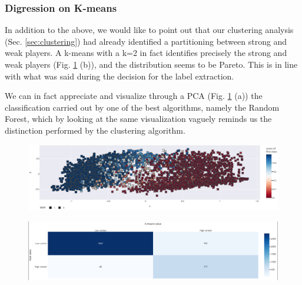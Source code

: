 \subsubsection{Digression on K-means}
In addition to the above, we would like to point out that our clustering analysis (Sec. \ref{sec:clustering}) had already identified a partitioning between strong and weak players. A k-means with a k=2 in fact identifies precisely the strong and weak players (Fig. \ref{fig:k_means_comparison} (b)), and the distribution seems to be Pareto. This is in line with what was said during the decision for the label extraction.

We can in fact appreciate and visualize through a PCA (Fig. \ref{fig:k_means_comparison} (a)) the classification carried out by one of the best algorithms, namely the Random Forest, which by looking at the same visualization vaguely reminds us the distinction performed by the clustering algorithm.

\begin{figure}[h]
	\centering
	\begin{minipage}{.48\textwidth}
	    \centering
    	\includegraphics[width=\textwidth]{plots/classification/random_forest_pca.png}
    	\label{fig:random_forest_pca}
	\end{minipage}
	\begin{minipage}{.48\textwidth}
	    \centering
		\includegraphics[width=\textwidth]{plots/classification/confusion_matrix_kmeans.png}
    	\label{fig:k_means_classification}
	\end{minipage}
	\label{fig:k_means_comparison}
\end{figure}